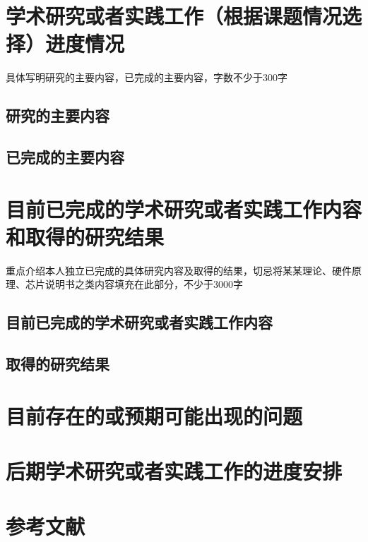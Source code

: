 \section{学术研究或者实践工作（根据课题情况选择）进度情况}
具体写明研究的主要内容，已完成的主要内容，字数不少于300字
\subsection{研究的主要内容}
\subsection{已完成的主要内容}
\section{目前已完成的学术研究或者实践工作内容和取得的研究结果}
重点介绍本人独立已完成的具体研究内容及取得的结果，切忌将某某理论、硬件原理、芯片说明书之类内容填充在此部分，不少于3000字
\subsection{目前已完成的学术研究或者实践工作内容}
\subsection{取得的研究结果}
\section{目前存在的或预期可能出现的问题}
\section{后期学术研究或者实践工作的进度安排}
\section{参考文献}



